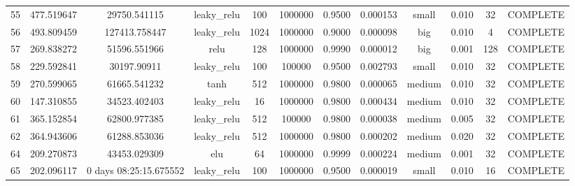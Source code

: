 \begin{longtable}{cccccccccccc}
                       55 &                 477.519647 &                       29750.541115 &     leaky\_relu &         100 &      1000000 & 0.9500 &       0.000153 &     small & 0.010 &          32 & COMPLETE \\
                       56 &                 493.809459 &                      127413.758447 &     leaky\_relu &        1024 &      1000000 & 0.9000 &       0.000098 &       big & 0.010 &           4 & COMPLETE \\
                       57 &                 269.838272 &                       51596.551966 &            relu &         128 &      1000000 & 0.9990 &       0.000012 &       big & 0.001 &         128 & COMPLETE \\
                       58 &                 229.592841 &                        30197.90911 &     leaky\_relu &         100 &       100000 & 0.9500 &       0.002793 &     small & 0.010 &          32 & COMPLETE \\
                       59 &                 270.599065 &                       61665.541232 &            tanh &         512 &      1000000 & 0.9800 &       0.000065 &    medium & 0.010 &          32 & COMPLETE \\
                       60 &                 147.310855 &                       34523.402403 &     leaky\_relu &          16 &      1000000 & 0.9800 &       0.000434 &    medium & 0.010 &          32 & COMPLETE \\
                       61 &                 365.152854 &                       62800.977385 &     leaky\_relu &         512 &       100000 & 0.9800 &       0.000038 &    medium & 0.005 &          32 & COMPLETE \\
                       62 &                 364.943606 &                       61288.853036 &     leaky\_relu &         512 &      1000000 & 0.9800 &       0.000202 &    medium & 0.020 &          32 & COMPLETE \\
                       64 &                 209.270873 &                       43453.029309 &             elu &          64 &      1000000 & 0.9999 &       0.000224 &    medium & 0.001 &          32 & COMPLETE \\
                       65 &                 202.096117 &             0 days 08:25:15.675552 &      leaky_relu &         100 &      1000000 & 0.9500 &       0.000019 &     small & 0.010 &          16 & COMPLETE \\
\end{longtable}
